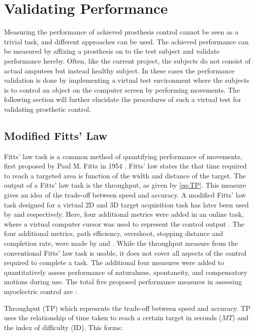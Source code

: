 
\section{Validating Performance} \label{sec:BG:validatingPerformance}

Measuring the performance of achieved prosthesis control cannot be seen as a trivial task, and different approaches can be used. The achieved performance can be measured by affixing a prosthesis on to the test subject and validate performance hereby. Often, like the current project, the subjects do not consist of actual amputees but instead healthy subject. In these cases the performance validation is done by implementing a virtual test environment where the subjects is to control an object on the computer screen by performing movements. The following section will further elucidate the procedures of such a virtual test for validating prosthetic control.      


\subsection{Modified Fitts' Law} \label{sub:BG:fitts}

Fitts' law task is a common method of quantifying performance of movements, first proposed by Paul M. Fitts in 1954 \cite{Fitts1954}. Fitts' law states the that time required to reach a targeted area is function of the width and distance of the target. The output of a Fitts' law task is the throughput, as given by \eqref{eq:TP}. This measure gives an idea of the trade-off between speed and accuracy. A modified Fitts' law task designed for a virtual 2D and 3D target acquisition task has later been used by \cite{Kamavuako2014} and \cite{Scheme2013} respectively. Here, four additional metrics were added in an online task, where a virtual computer cursor was used to represent the control output \cite{Scheme2013, Kamavuako2014}. The four additional metrics, path efficiency, overshoot, stopping distance and completion rate, were made by \cite{Poulton2013} and \cite{Simon2011}. While the throughput measure from the conventional Fitts' law task is usable, it does not cover all aspects of the control required to complete a task. The additional four measures were added to quantitatively assess performance of naturalness, spontaneity, and compensatory motions during use. The total five proposed performance measures in assessing myoelectric control are \cite{Scheme2013a}: 

Throughput (TP) which represents the trade-off between speed and accuracy. TP uses the relationship of time taken to reach a certain target in seconds ($MT$) and the index of difficulty (ID). This forms: \cite{Scheme2013,Fitts1954}

